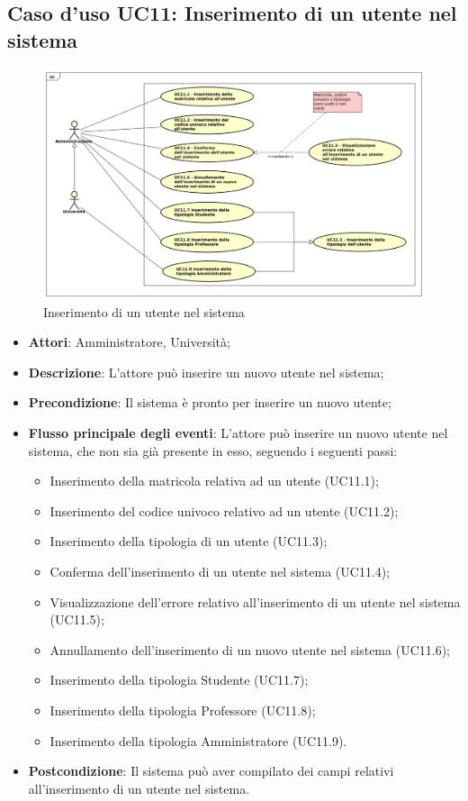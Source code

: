 \subsection{Caso d'uso \texorpdfstring{UC11}{UC11}: Inserimento di un utente nel sistema}
\begin{figure} [H]
	\centering
	\includegraphics[scale=0.45]{./img/UC11.pdf}
	\caption{Inserimento di un utente nel sistema}\label{}
\end{figure}
\begin{itemize}
	\item \textbf{Attori}: Amministratore, Università;
	\item \textbf{Descrizione}: L'attore può inserire un nuovo utente nel sistema;
	\item \textbf{Precondizione}: Il sistema è pronto per inserire un nuovo utente;
	\item \textbf{Flusso principale degli eventi}: L'attore può inserire un nuovo utente nel sistema, che non sia già presente in esso, seguendo i seguenti passi:
	\begin{itemize}
		\item Inserimento della matricola relativa ad un utente (UC11.1);
		\item Inserimento del codice univoco relativo ad un utente (UC11.2);
		\item Inserimento della tipologia di un utente  (UC11.3);
		\item Conferma dell'inserimento di un utente nel sistema (UC11.4);
		\item Visualizzazione dell'errore relativo all'inserimento di un utente nel sistema (UC11.5);
		\item Annullamento dell'inserimento di un nuovo utente nel sistema (UC11.6);
		\item Inserimento della tipologia Studente (UC11.7);
		\item Inserimento della tipologia Professore (UC11.8);
		\item Inserimento della tipologia Amministratore (UC11.9).
	\end{itemize}
	\item \textbf{Postcondizione}: Il sistema può aver compilato dei campi relativi all'inserimento di un utente nel sistema.
	
\end{itemize}
